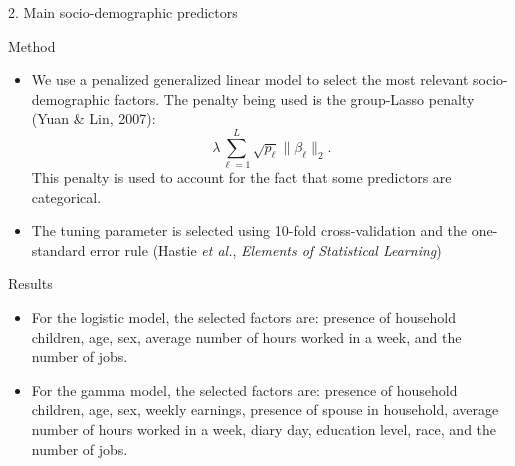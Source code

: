 \documentclass[final]{beamer}
\newcounter{acolumn}%
\def\autoheight{\vspace*{0pt}}%
\begin{document}
\begin{frame}
\begin{acolumns}[t]
\begin{column}{.48\linewidth}
                     
    \end{column}
              
    
    \begin{column}{.48\linewidth}
    \begin{center}
    	\LARGE{2. Main socio-demographic predictors}
    \end{center}
     \begin{block}{Method}
     	\begin{itemize}
     		\item We use a penalized generalized linear model to select the most relevant socio-demographic factors. The penalty being used is the group-Lasso penalty (Yuan \& Lin, 2007):
     		$$\lambda \sum_{\ell=1}^{L}\sqrt{p_\ell}\|\beta_\ell\|_2.$$
     		This penalty is used to account for the fact that some predictors are categorical.
     		\item The tuning parameter is selected using 10-fold cross-validation and the one-standard error rule (Hastie \emph{et al.}, \emph{Elements of Statistical Learning})
     	\end{itemize}
        
                     
     \end{block}
          
          
     \begin{block}{Results}
        \begin{itemize}
        	\item For the logistic model, the selected factors are: presence of household children, age, sex, average number of hours worked in a week, and the number of jobs.
        	
        	\item For the gamma model, the selected factors are: presence of household children, age, sex, weekly earnings, presence of spouse in household, average number of hours worked in a week, diary day, education level, race, and the number of jobs.
        \end{itemize}
       \autoheight                   
     \end{block}
     
        
    \end{column}
    
    
    \end{acolumns}
    
    \vfill
    
        \begin{acolumns}[t]
        

\end{acolumns}
\end{frame}
\end{document}
